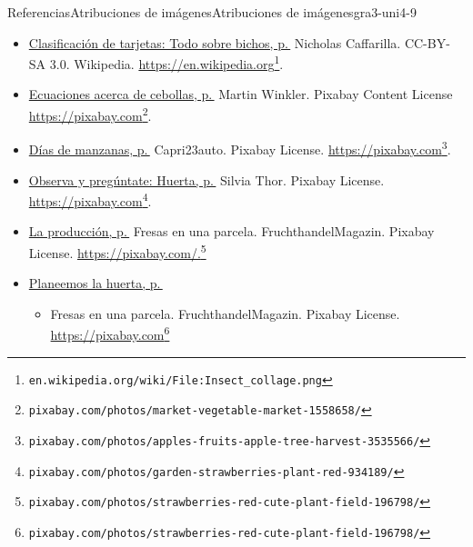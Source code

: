 \documentclass[twoside,10pt,]{article}
\begin{document}
\begin{references-section}{Referencias}{Atribuciones de imágenes}{}{Atribuciones de imágenes}{}{}{gra3-uni4-9}
\begin{itemize}[label=\textbullet]
\begin{itemize}[label=$\circ$]
\end{itemize}
\item{}\hyperref[act-clasificacionDeTarjetas-todoSobreBichos]{Clasificación de tarjetas: Todo sobre bichos, p.\,\pageref{act-clasificacionDeTarjetas-todoSobreBichos}} Nicholas Caffarilla. CC-BY-SA 3.0. Wikipedia. \href{https://en.wikipedia.org/wiki/File:Insect_collage.png}{https:\slash{}\slash{}en.wikipedia.org}\footnote{\nolinkurl{en.wikipedia.org/wiki/File:Insect_collage.png}\label{gra3-uni4-9-2-4-3}}.%
\item{}\hyperref[act-ecuacionesCebollas]{Ecuaciones acerca de cebollas, p.\,\pageref{act-ecuacionesCebollas}} Martin Winkler. Pixabay Content License \href{https://pixabay.com/photos/market-vegetable-market-1558658/}{https:\slash{}\slash{}pixabay.com}\footnote{\nolinkurl{pixabay.com/photos/market-vegetable-market-1558658/}\label{gra3-uni4-9-2-5-3}}.%
\item{}\hyperref[act-diasDeManzanas]{Días de manzanas, p.\,\pageref{act-diasDeManzanas}} Capri23auto. Pixabay License. \href{https://pixabay.com/photos/apples-fruits-apple-tree-harvest-3535566/}{https:\slash{}\slash{}pixabay.com}\footnote{\nolinkurl{pixabay.com/photos/apples-fruits-apple-tree-harvest-3535566/}\label{gra3-uni4-9-2-6-3}}.%
\item{}\hyperref[warm-observa-huerta]{Observa y pregúntate: Huerta, p.\,\pageref{warm-observa-huerta}} Silvia Thor. Pixabay License. \href{https://pixabay.com/photos/garden-strawberries-plant-red-934189/}{https:\slash{}\slash{}pixabay.com}\footnote{\nolinkurl{pixabay.com/photos/garden-strawberries-plant-red-934189/}\label{gra3-uni4-9-2-7-3}}.%
\item{}\hyperref[act-produccionFresas]{La producción, p.\,\pageref{act-produccionFresas}} Fresas en una parcela. Fruchthandel\textunderscore{}Magazin. Pixabay License. \href{https://pixabay.com/photos/strawberries-red-cute-plant-field-196798/}{https:\slash{}\slash{}pixabay.com\slash{}.}\footnote{\nolinkurl{pixabay.com/photos/strawberries-red-cute-plant-field-196798/}\label{gra3-uni4-9-2-8-3}}%
\item{}\hyperref[act-planeemosLaHuerta]{Planeemos la huerta, p.\,\pageref{act-planeemosLaHuerta}}%
%
\begin{itemize}[label=$\circ$]
\item{}Fresas en una parcela. Fruchthandel\textunderscore{}Magazin. Pixabay License. \href{https://pixabay.com/photos/strawberries-red-cute-plant-field-196798/}{https:\slash{}\slash{}pixabay.com}\footnote{\nolinkurl{pixabay.com/photos/strawberries-red-cute-plant-field-196798/}\label{gra3-uni4-9-2-9-2-1-1-2}}%

\end{itemize}
\end{itemize}
\end{references-section}
\end{document}
